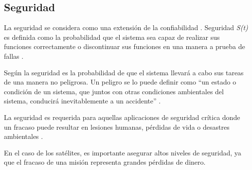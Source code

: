 \subsection{Seguridad}\label{subsec:seguridad}
La seguridad se considera como una extensión de la confiabilidad \citep{FTDesign}. Seguridad
\textit{S(t)} es definida como la probabilidad que el sistema sea capaz de realizar sus funciones
correctamente o discontinuar sus funciones en una manera a prueba de fallas \citep{FTDesign}.

Según \cite{SoftwareFaultToleranceATutorial} la seguridad es la probabilidad de que el sistema
llevará a cabo sus tareas de una manera no peligrosa. Un peligro se lo puede definir como ``un
estado o condición de un sistema, que juntos con otras condiciones ambientales del sistema,
conducirá inevitablemente a un accidente'' \citep{SoftwareFaultToleranceATutorial}.

La seguridad es requerida para aquellas aplicaciones de seguridad crítica donde un fracaso puede
resultar en lesiones humanas, pérdidas de vida o desastres ambientales \citep{FTDesign}.

En el caso de los satélites, es importante asegurar altos niveles de seguridad, ya que
el fracaso de una misión representa grandes pérdidas de dinero. 

